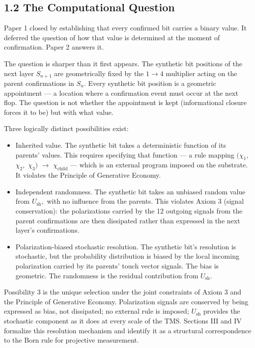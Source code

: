 \documentclass[11pt,oneside]{report}
\theoremstyle{definition}
\theoremstyle{remark}
\begin{document}
\subsection*{1.2 The Computational Question}

Paper 1 closed by establishing that every confirmed bit carries a binary
value. It deferred the question of how that value is determined at the
moment of confirmation. Paper 2 answers it.

The question is sharper than it first appears. The synthetic bit
positions of the next layer \ensuremath{S_{n+1}} are geometrically fixed by the \ensuremath{1\to 4}
multiplier acting on the parent confirmations in \ensuremath{S_{n}.} Every synthetic bit
position is a geometric appointment --- a location where a confirmation
event must occur at the next flop. The question is not whether the
appointment is kept (informational closure forces it to be) but with
what value.

Three logically distinct possibilities exist:

\begin{itemize}
\item
  Inherited value. The synthetic bit takes a deterministic function of
  its parents' values. This requires specifying that function --- a rule
  mapping \ensuremath{(\chi_{1},} \ensuremath{\chi_{2},} \ensuremath{\chi_{3})} \ensuremath{\to} \ensuremath{\chi_{\mathrm{child}}} --- which is an external program
  imposed on the substrate. It violates the Principle of Generative
  Economy.
\item
  Independent randomness. The synthetic bit takes an unbiased random
  value from \ensuremath{U_{\mathrm{sh}},} with no influence from the parents. This violates
  Axiom 3 (signal conservation): the polarizations carried by the 12
  outgoing signals from the parent confirmations are then dissipated
  rather than expressed in the next layer's confirmations.
\item
  Polarization-biased stochastic resolution. The synthetic bit's
  resolution is stochastic, but the probability distribution is biased
  by the local incoming polarization carried by its parents' touch
  vector signals. The bias is geometric. The randomness is the residual
  contribution from \ensuremath{U_{\mathrm{sh}}.}
\end{itemize}

Possibility 3 is the unique selection under the joint constraints of
Axiom 3 and the Principle of Generative Economy. Polarization signals
are conserved by being expressed as bias, not dissipated; no external
rule is imposed; \ensuremath{U_{\mathrm{sh}}} provides the stochastic component as it does at
every scale of the TMS. Sections III and IV formalize this resolution
mechanism and identify it as a structural correspondence to the Born
rule for projective measurement.
\end{document}
